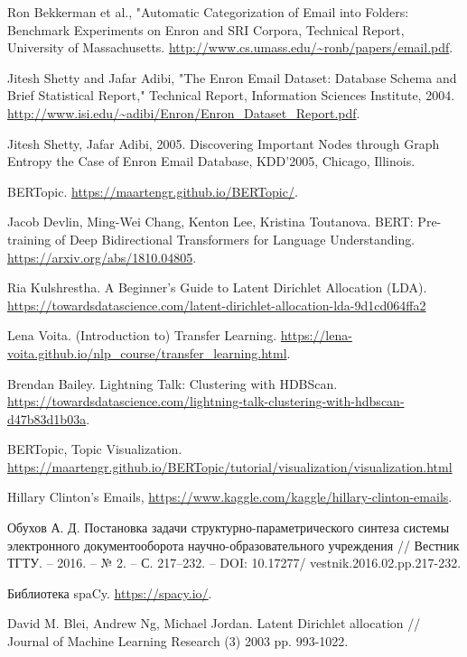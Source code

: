 
\begin{thebibliography}{3}

Ron Bekkerman et al., "Automatic Categorization of Email into Folders:
Benchmark Experiments on Enron and SRI Corpora, Technical Report,
University of Massachusetts. \url{http://www.cs.umass.edu/~ronb/papers/email.pdf}.

Jitesh Shetty and Jafar Adibi, "The Enron Email Dataset: Database Schema and Brief Statistical Report," Technical Report, Information Sciences Institute, 2004. \url{http://www.isi.edu/~adibi/Enron/Enron_Dataset_Report.pdf}.

Jitesh Shetty, Jafar Adibi, 2005. Discovering Important Nodes
through Graph Entropy the Case of Enron Email Database,
KDD’2005, Chicago, Illinois.

BERTopic. \url{https://maartengr.github.io/BERTopic/}.

Jacob Devlin, Ming-Wei Chang, Kenton Lee, Kristina Toutanova. BERT: Pre-training of Deep Bidirectional Transformers for Language Understanding. 
\url{https://arxiv.org/abs/1810.04805}.

Ria Kulshrestha. A Beginner’s Guide to Latent Dirichlet Allocation (LDA). \url{https://towardsdatascience.com/latent-dirichlet-allocation-lda-9d1cd064ffa2}

Lena Voita. 
(Introduction to) Transfer Learning. \url{https://lena-voita.github.io/nlp_course/transfer_learning.html}.

Brendan Bailey. Lightning Talk: Clustering with HDBScan. \url{https://towardsdatascience.com/lightning-talk-clustering-with-hdbscan-d47b83d1b03a}.

BERTopic, Topic Visualization. \url{https://maartengr.github.io/BERTopic/tutorial/visualization/visualization.html}


Hillary Clinton's Emails,
\url{https://www.kaggle.com/kaggle/hillary-clinton-emails}.

Обухов А. Д. Постановка задачи структурно-параметрического синтеза системы
электронного документооборота научно-образовательного учреждения // Вестник ТГТУ. –
2016. – № 2. – С. 217–232. – DOI: 10.17277/
vestnik.2016.02.pp.217-232.

Библиотека spaCy. \url{https://spacy.io/}.

David M. Blei, Andrew Ng, Michael Jordan. Latent Dirichlet allocation // Journal of Machine Learning Research (3) 2003 pp. 993-1022.


\end{thebibliography}
